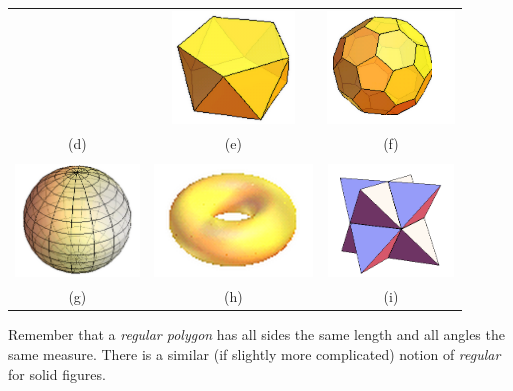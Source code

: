 \begin{center}
\begin{tabular}{ccc}
\quad
&
\quad
\includegraphics[height=3cm]{pentantiprism}
\quad
&
\quad
\includegraphics[height=3cm]{soccerball}
\quad\\
(d) & (e) & (f)\\
\\
\quad
\includegraphics[height=3cm]{sphere}
\quad
&
\quad
\includegraphics[height=3cm]{torus}
\quad
&
\quad
\includegraphics[height=3cm]{stella}
\quad\\
(g) & (h) & (i)\\
\end{tabular}

\end{center}

\newpage

Remember that a  \emph{regular polygon} has all sides the same length and all angles the same measure.    
There is a similar (if slightly more complicated) notion of \emph{regular} for solid figures.


